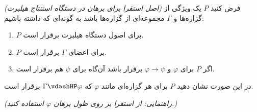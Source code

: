 \emph{(اصل استقرا برای برهان در دستگاه استنتاج هیلبرت) }
فرض کنید $P$ یک ویژگی از گزاره‌ها و $\Gamma$ مجموعه‌ای از گزاره‌ها باشد به گونه‌ای که داشته باشیم:
\begin{enumerate}
    \item $P$ برای اصول دستگاه هیلبرت برقرار است.
    \item $P$ برای اعضای $\Gamma$ برقرار است.
    \item اگر $P$ برای $\varphi$ و $\varphi \rightarrow \psi$ برقرار باشد آن‌گاه برای $\psi$ هم برقرار است.
\end{enumerate}
در این صورت نشان دهید $P$ برای هر گزاره‌ای مانند $\varphi$ که $\Gamma \vdashHP \varphi$ برقرار است.

\emph{(راهنمایی: از استقرا بر روی طول برهان $\varphi$ استفاده کنید.)}
